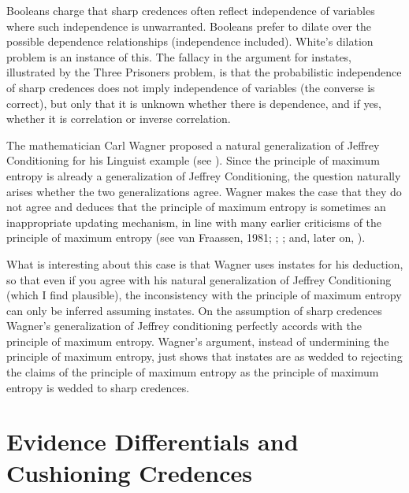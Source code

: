 \documentclass[11pt]{article}
\begin{document}
Booleans charge that sharp credences often reflect independence of
variables where such independence is unwarranted. Booleans prefer to
dilate over the possible dependence relationships (independence
included). White's dilation problem is an instance of this. The
fallacy in the argument for instates, illustrated by the Three
Prisoners problem, is that the probabilistic independence of sharp
credences does not imply independence of variables (the converse is
correct), but only that it is unknown whether there is dependence, and
if yes, whether it is correlation or inverse correlation.


The mathematician Carl Wagner proposed a natural generalization of
Jeffrey Conditioning for his Linguist example (see
). Since the principle of maximum entropy is
already a generalization of Jeffrey Conditioning, the question
naturally arises whether the two generalizations agree. Wagner makes
the case that they do not agree and deduces that the principle of
maximum entropy is sometimes an inappropriate updating mechanism, in
line with many earlier criticisms of the principle of maximum entropy
(see van Fraassen, 1981; ;
; and, later on,
).

What is interesting about this case is that Wagner uses instates for
his deduction, so that even if you agree with his natural
generalization of Jeffrey Conditioning (which I find plausible), the
inconsistency with the principle of maximum entropy can only be
inferred assuming instates. On the assumption of sharp credences
Wagner's generalization of Jeffrey conditioning perfectly accords with
the principle of maximum entropy. Wagner's argument, instead of
undermining the principle of maximum entropy, just shows that instates
are as wedded to rejecting the claims of the principle of maximum
entropy as the principle of maximum entropy is wedded to sharp
credences.

\section{Evidence Differentials and Cushioning Credences}
\label{WalleysWorldCupWoes}
\end{document}
